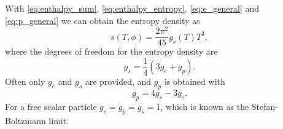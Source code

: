 With \eqref{eq:enthalpy_sum}, \eqref{eq:enthalpy_entropy}, \eqref{eq:e_general} and \eqref{eq:p_general} we can obtain the entropy density as
\cite[eq. S12]{borsanyi_lattice_2016}
\begin{equation}
s(T,\phi) = \frac{2\pi^2}{45} g_s(T) T^3,
\label{eq:s_general}
\end{equation}
where the degrees of freedom for the entropy density are
\begin{equation}
g_s = \frac{1}{4} (3g_e + g_p).
\end{equation}
Often only $g_e$ and $g_s$ are provided, and $g_p$ is obtained with
\begin{equation}
g_p = 4g_s - 3g_e.
\end{equation}
For a free scalar particle $g_e = g_p = g_s = 1$, which is known as the Stefan-Boltzmann limit.
\iffalse
due to its reminiscence to the Stefan-Boltzmann law $j^* = \sigma T^4$,
which relates the power radiated by a black body to its temperature with the Stefan-Boltzmann constant $\sigma$.
\fi
